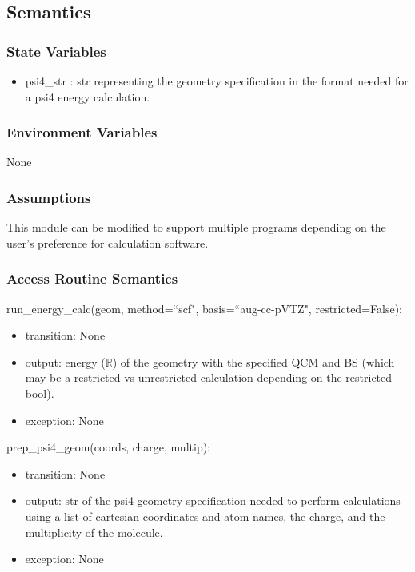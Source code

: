 \documentclass[12pt, titlepage]{article}
\begin{document}
\subsection{Semantics}

\subsubsection{State Variables}

\begin{itemize}
	\item psi4\_str : str representing the geometry specification in the format 
	needed for a psi4 energy calculation.
\end{itemize}


\subsubsection{Environment Variables}

None

\subsubsection{Assumptions}

This module can be modified to support multiple programs depending on the 
user's preference for calculation software.

\subsubsection{Access Routine Semantics}

\noindent run\_energy\_calc(geom, method=``scf", basis=``aug-cc-pVTZ",
restricted=False):
\begin{itemize}
	\item transition: None
	\item output: energy ($\mathbb{R}$) of the geometry with the specified QCM 
	and BS (which may be a restricted vs unrestricted calculation depending on 
	the restricted bool).
	\item exception: None
\end{itemize}

\noindent prep\_psi4\_geom(coords, charge, multip):
\begin{itemize}
	\item transition: None
	\item output: str of the psi4 geometry specification needed to perform 
	calculations using a list of cartesian coordinates and atom names, the 
	charge, and the multiplicity of the molecule.
	\item exception: None
\end{itemize}
\end{document}
